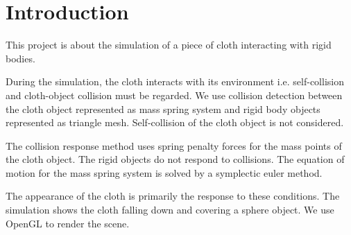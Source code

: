 \section{Introduction}
This project is about the simulation of a piece of cloth interacting with rigid bodies.\par

During the simulation, the cloth interacts with its environment i.e. self-collision and cloth-object collision must be regarded. We use collision detection between the cloth object represented as mass spring system and rigid body objects represented as triangle mesh. Self-collision of the cloth object is not considered.\par

The collision response method uses spring penalty forces for the mass points of the cloth object. The rigid objects do not respond to collisions. The equation of motion for the mass spring system is solved by a symplectic euler method.\par

The appearance of the cloth is primarily the response to these conditions. The simulation shows the cloth falling down and covering a sphere object. We use OpenGL to render the scene.